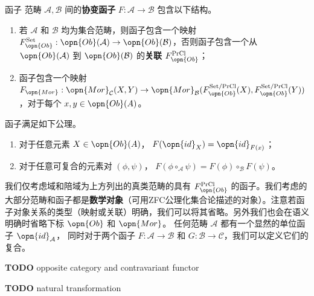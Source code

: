 \begin{definition}{函子}
范畴 $\mathcal{A},\mathcal{B}$ 间的\textbf{协变函子} $F:\mathcal{A}\to\mathcal{B}$ 包含以下结构。
\begin{enumerate}
    \item 若 $\mathcal{A}$ 和 $\mathcal{B}$ 均为集合范畴，则函子包含一个映射 $F_{\opn{Ob}}^{\text{Set}}:\opn{Ob}(\mathcal{A})\to\opn{Ob}(\mathcal{B})$，否则函子包含一个从 $\opn{Ob}(\mathcal{A})$ 到 $\opn{Ob}(\mathcal{B})$ 的\textbf{关联} $F_{\opn{Ob}}^{\text{PrCl}}$；
    \item 函子包含一个映射 $F_{\opn{Mor}}:\opn{Mor}_\mathcal{C}(X,Y)\to\opn{Mor}_\mathcal{B}(F_{\opn{Ob}}^{\text{Set/PrCl}}(X),F_{\opn{Ob}}^{\text{Set/PrCl}}(Y))$，对于每个 $x,y\in\opn{Ob}(A)$。
\end{enumerate}
函子满足如下公理。
\begin{enumerate}
    \item 对于任意元素 $X\in\opn{Ob}(A)$， $F(\opn{id}_X)=\opn{id}_{F(x)}$；
    \item 对于任意可复合的元素对 $(\phi,\psi)$， $F(\phi\circ_\mathcal{A}\psi)=F(\phi)\circ_\mathcal{B}F(\psi)$。
\end{enumerate}
\end{definition}
我们仅考虑域和陪域为上方列出的真类范畴的具有 $F_{\opn{Ob}}^{\text{PrCl}}$ 的函子。我们考虑的大部分范畴和函子都是\textbf{数学对象}（可用ZFC公理化集合论描述的对象）。注意若函子对象关系的类型（映射或关联）明确，我们可以将其省略。另外我们也会在语义明确时省略下标 $\opn{Ob}$ 和 $\opn{Mor}$。 任何范畴 $\mathcal{A}$ 都有一个显然的单位函子 $\opn{id}_\mathcal{A}$， 同时对于两个函子 $F:\mathcal{A}\to\mathcal{B}$ 和 $G:\mathcal{B}\to\mathcal{C}$，我们可以定义它们的复合。

\textbf{TODO} opposite category and contravariant functor

\textbf{TODO} natural transformation

